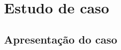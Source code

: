 \documentclass[dvipdfm]{beamer}
\begin{document}
\section{Estudo de caso}
\subsection{Apresentação do caso}

\end{document}
